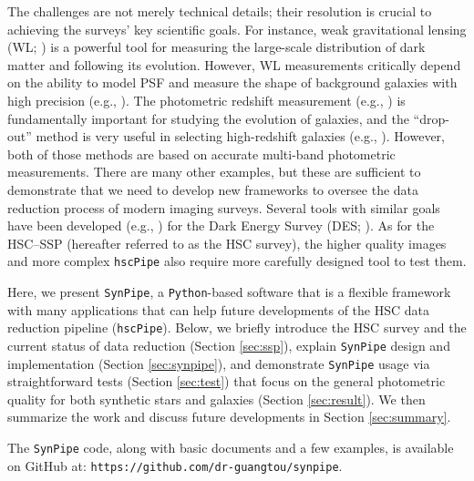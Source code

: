 \documentclass[useamsfonts]{pasj01}
\def\hscpipe{\texttt{hscPipe}}
\def\synpipe{\texttt{SynPipe}}
\begin{document}
    The challenges are not merely technical details; their resolution is crucial
    to achieving the surveys' key scientific goals.
    For instance, weak gravitational lensing (WL; \citealt{Kaiser1993, Bartelmann2001})
    is a powerful tool for measuring the large-scale distribution of dark matter and
    following its evolution.
    However, WL measurements critically depend on the ability to model PSF and measure 
    the shape of background galaxies with high precision 
    (e.g., \citealt{Mandelbaum2015}).
    The photometric redshift measurement (e.g., \citealt{Benitez2000, Bolzonella2000,
    Ilbert2009}) is fundamentally important for studying the evolution of galaxies,
    and the ``drop-out'' method is very useful in selecting high-redshift galaxies
    (e.g., \citealt{Steidel1996}).
    However, both of those methods are based on accurate multi-band photometric 
    measurements.
    There are many other examples, but these are sufficient to demonstrate that we 
    need to develop new frameworks to oversee the data reduction process of modern 
    imaging surveys.
    Several tools with similar goals have been developed (e.g., \citealt{Chang2015,
    Suchyta2016}) for the Dark Energy Survey (DES; \citealt{DES2005}). 
    As for the HSC--SSP (hereafter referred to as the HSC survey), the higher quality 
    images and more complex \hscpipe{} also require more carefully designed tool to 
    test them.

    Here, we present \synpipe{}, a \texttt{Python}-based software that is a flexible 
    framework with many applications that can help future developments of the HSC data 
    reduction pipeline (\hscpipe{}).
    Below, we briefly introduce the HSC survey and the current status of data 
    reduction (Section \ref{sec:ssp}), explain \synpipe{} design and implementation 
    (Section \ref{sec:synpipe}), and demonstrate \synpipe{} usage via straightforward 
    tests (Section \ref{sec:test}) that focus on the general photometric quality for 
    both synthetic stars and galaxies (Section \ref{sec:result}).
    We then summarize the work and discuss future developments in 
    Section \ref{sec:summary}.

    The \synpipe{} code, along with basic documents and a few examples, is available
    on GitHub at: \texttt{https://github.com/dr-guangtou/synpipe}.
\end{document}
